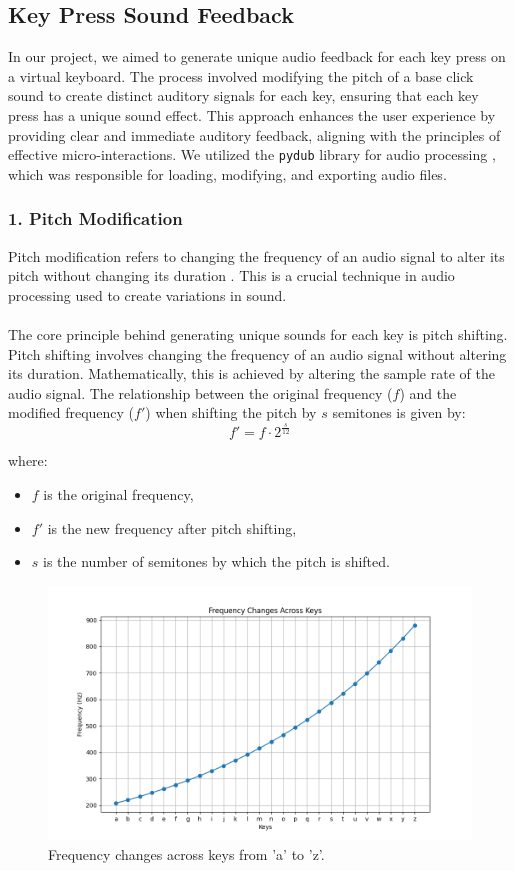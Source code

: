 \subsection{Key Press Sound Feedback} 

In our project, we aimed to generate unique audio feedback for each key press on a virtual keyboard. The process involved modifying the pitch of a base click sound to create distinct auditory signals for each key, ensuring that each key press has a unique sound effect. This approach enhances the user experience by providing clear and immediate auditory feedback, aligning with the principles of effective micro-interactions. We utilized the \texttt{pydub} library for audio processing \cite{pydub}, which was responsible for loading, modifying, and exporting audio files.

\subsubsection*{1. Pitch Modification}

Pitch modification refers to changing the frequency of an audio signal to alter its pitch without changing its duration \cite{smith1999}. This is a crucial technique in audio processing used to create variations in sound.\\ \\
\noindent
The core principle behind generating unique sounds for each key is pitch shifting. Pitch shifting involves changing the frequency of an audio signal without altering its duration. Mathematically, this is achieved by altering the sample rate of the audio signal.
The relationship between the original frequency (\( f \)) and the modified frequency (\( f' \)) when shifting the pitch by \( s \) semitones is given by:
\begin{equation}
f' = f \cdot 2^{\frac{s}{12}}
\end{equation}


where:
\begin{itemize}
  \item \( f \) is the original frequency,
  \item \( f' \) is the new frequency after pitch shifting,
  \item \( s \) is the number of semitones by which the pitch is shifted.
\end{itemize}
\begin{figure}[h!]
    \centering
    \includegraphics[width=0.8\linewidth]{Development/frequency_changes.png}
    \caption{Frequency changes across keys from 'a' to 'z'.}
    \label{fig:keyboard_sin}
\end{figure} \noindent
